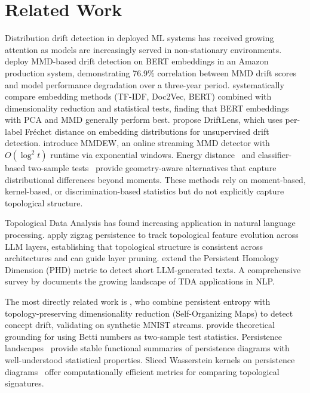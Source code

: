 \section{Related Work}
\label{sec:related}

Distribution drift detection in deployed ML systems has received growing attention as models are increasingly served in non-stationary environments. \citet{khaki2023uncovering} deploy MMD-based drift detection on BERT embeddings in an Amazon production system, demonstrating 76.9\% correlation between MMD drift scores and model performance degradation over a three-year period. \citet{sodar2023detecting} systematically compare embedding methods (TF-IDF, Doc2Vec, BERT) combined with dimensionality reduction and statistical tests, finding that BERT embeddings with PCA and MMD generally perform best. \citet{greco2024driftlens} propose DriftLens, which uses per-label Fr\'{e}chet distance on embedding distributions for unsupervised drift detection. \citet{kalinke2022mmdew} introduce MMDEW, an online streaming MMD detector with $O(\log^2 t)$ runtime via exponential windows. Energy distance~\cite{szekely2004testing} and classifier-based two-sample tests~\cite{lopez2017revisiting} provide geometry-aware alternatives that capture distributional differences beyond moments. These methods rely on moment-based, kernel-based, or discrimination-based statistics but do not explicitly capture topological structure.

Topological Data Analysis has found increasing application in natural language processing. \citet{gardinazzi2024persistent} apply zigzag persistence to track topological feature evolution across LLM layers, establishing that topological structure is consistent across architectures and can guide layer pruning. \citet{wei2025shortphd} extend the Persistent Homology Dimension (PHD) metric to detect short LLM-generated texts. A comprehensive survey by \citet{chen2024tdasurvey} documents the growing landscape of TDA applications in NLP.

The most directly related work is \citet{basterrech2024unsupervised}, who combine persistent entropy with topology-preserving dimensionality reduction (Self-Organizing Maps) to detect concept drift, validating on synthetic MNIST streams. \citet{bobrowski2022testing} provide theoretical grounding for using Betti numbers as two-sample test statistics. Persistence landscapes~\cite{bubenik2015statistical} provide stable functional summaries of persistence diagrams with well-understood statistical properties. Sliced Wasserstein kernels on persistence diagrams~\cite{carriere2017sliced} offer computationally efficient metrics for comparing topological signatures.


